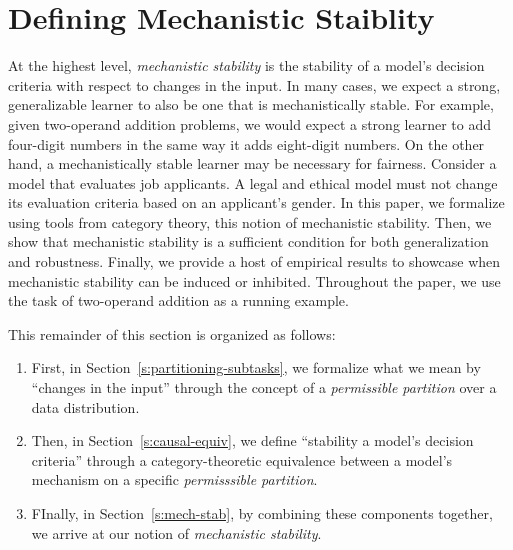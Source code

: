 
\section{Defining Mechanistic Staiblity}
At the highest level, \textit{mechanistic stability} is the stability
of a model's decision criteria with respect to changes in the input.
In many cases, we expect a strong, generalizable learner to also be
one that is mechanistically stable. For example, given two-operand
addition problems, we would expect a strong learner to add four-digit
numbers in the same way it adds eight-digit numbers. On the other
hand, a mechanistically stable learner may be necessary for fairness.
Consider a model that evaluates job applicants. A legal and ethical model
must not change its evaluation criteria based on an applicant's gender. 
In this paper, we formalize using tools from category theory, this notion
of mechanistic stability. Then, we show that mechanistic stability is a
sufficient condition for both generalization and robustness. Finally, we
provide a host of empirical results to showcase when mechanistic stability
can be induced or inhibited. Throughout the paper, we use the task of 
two-operand addition as a running
example.

This remainder of this section is organized as follows:
\begin{enumerate}
\item First, in Section~\ref{s:partitioning-subtasks}, we formalize 
what we mean by ``changes in the input'' through
the concept of a \textit{permissible partition} over a data distribution.
\item Then, in Section~\ref{s:causal-equiv}, we define ``stability a model's decision criteria'' through
a category-theoretic equivalence between a model's mechanism on a specific
\textit{permisssible partition}. 
\item FInally, in Section~\ref{s:mech-stab}, by combining these components 
together, we arrive at our
notion of \textit{mechanistic stability}.
\end{enumerate}

